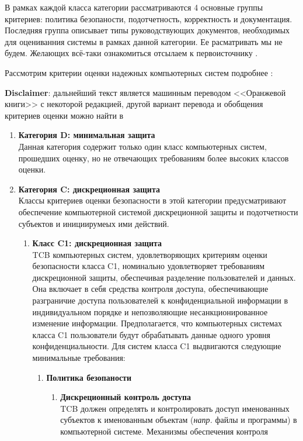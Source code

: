 В рамках каждой класса категории рассматриваются 4 основные группы критериев: политика безопаности, подотчетность, корректность и документация. Последняя группа описывает типы руководствующих 
документов, необходимых для оцениванния системы в рамках данной категории. Ее расматривать мы не будем. Желающих всё-таки ознакомиться отсылаем к первоисточнику \cite{OrangeBook}.

Рассмотрим критерии оценки надежных компьютерных систем подробнее \cite[Part 1]{OrangeBook}:

\textbf{Disclaimer}: дальнейший текст является машинным переводом <<Оранжевой книги>> с некоторой редакцией, другой вариант перевода и 
обобщения критериев оценки можно найти в \cite{OrangeBookTranslation}

\begin{enumerate}
	\item{\textbf{Категория D: минимальная защита}}\\
	Данная категория содержит только один класс компьютерных систем, прошедших оценку, но не отвечающих требованиям более высоких классов оценки.
	\item{\textbf{Категория C: дискреционная защита}}\\
	Классы критериев оценки безопасности в этой категории предусматривают обеспечение компьютерной системой дискреционной защиты и подотчетности субъектов и инициирумеых ими действий.
	\begin{enumerate}
		\item{\textbf{Класс C1: дискреционная защита}}\\
		TCB компьютерных систем, удовлетворяющих критериям оценки безопасности класса C1, номинально удовлетворяет требованиям дискреционной защиты, обеспечивая разделение пользователей и данных.
		Она включает в себя средства контроля доступа, обеспечивающие разграничие доступа пользователей к конфиденциальной информации в индивидуальном порядке и непозволяющие несанкционированное
		изменение информации. Предполагается, что компьютерных системах класса C1 пользователи будут обрабатывать данные одного уровня конфиденциальности. Для систем класса C1 выдвигаются следующие
		минимальные требования:
		\begin{enumerate}
			\item{\textbf{Политика безопаности}}
			\begin{enumerate}
				\item{\textbf{Дискреционный контроль доступа}}\\
				TCB должен определять и контролировать доступ именованных субъектов к именованным объектам (\textit{напр.} файлы и программы) в компьютерной системе. Механизмы обеспечения контроля

\end{enumerate}
\end{enumerate}
\end{enumerate}
\end{enumerate}
